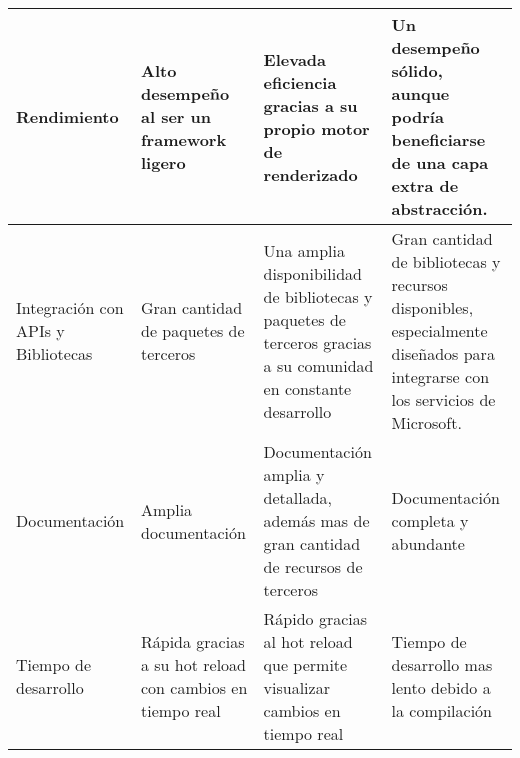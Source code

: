 \begin{longtable}{|p{5cm}|p{3cm}|p{3cm}|p{3cm}|}
    Rendimiento                                    & Alto desempeño al ser un framework ligero                 & Elevada eficiencia gracias a su propio motor de renderizado                                                    & Un desempeño sólido, aunque podría beneficiarse de una capa extra de abstracción.                                            \\\hline
    Integración con APIs y Bibliotecas             & Gran cantidad de paquetes de terceros                     & Una amplia disponibilidad de bibliotecas y paquetes de terceros gracias a su comunidad en constante desarrollo & Gran cantidad de bibliotecas y recursos disponibles, especialmente diseñados para integrarse con los servicios de Microsoft. \\\hline
    Documentación                                  & Amplia documentación                                      & Documentación amplia y detallada, además  mas de gran cantidad de recursos de terceros                         & Documentación completa y abundante                                                                                           \\\hline
    Tiempo de desarrollo                           & Rápida gracias a su hot reload con cambios en tiempo real & Rápido gracias al hot reload que permite visualizar cambios en tiempo real                                     & Tiempo de desarrollo mas lento debido a la compilación                                                                       \\
\end{longtable}